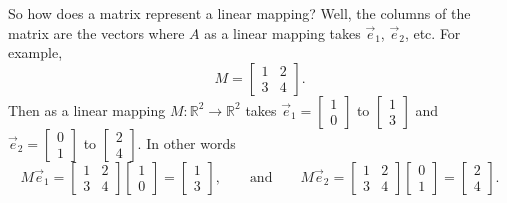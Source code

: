 So how does a matrix represent a linear mapping?
Well, the columns of the matrix are the vectors where $A$ as a linear
mapping takes $\vec{e}_1$, $\vec{e}_2$, etc.
For example, 
\begin{equation*}
M = 
\begin{bmatrix}
1 & 2 \\ 3 & 4
\end{bmatrix} .
\end{equation*}
Then as a linear mapping $M \colon {\mathbb R}^2 \to {\mathbb R}^2$ takes
$\vec{e}_1 = \left[ \begin{smallmatrix} 1 \\ 0 \end{smallmatrix} \right]$ to
$\left[ \begin{smallmatrix} 1 \\ 3 \end{smallmatrix} \right]$
and
$\vec{e}_2 = \left[ \begin{smallmatrix} 0 \\ 1 \end{smallmatrix} \right]$ to
$\left[ \begin{smallmatrix} 2 \\ 4 \end{smallmatrix} \right]$.  In other
words
\begin{equation*}
M \vec{e}_1 =
\begin{bmatrix}
1 & 2 \\ 3 & 4
\end{bmatrix}
\begin{bmatrix}
1 \\ 0
\end{bmatrix}
=
\begin{bmatrix}
1 \\ 3
\end{bmatrix},
\qquad
\text{and}
\qquad
M \vec{e}_2 =
\begin{bmatrix}
1 & 2 \\ 3 & 4
\end{bmatrix}
\begin{bmatrix}
0 \\ 1
\end{bmatrix}
=
\begin{bmatrix}
2 \\ 4
\end{bmatrix}.
\end{equation*}

